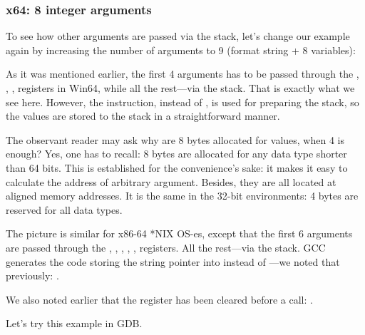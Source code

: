 \subsubsection{x64: 8 integer arguments}

\label{example_printf8_x64}
To see how other arguments are passed via the stack, let's change our example again 
by increasing the number of arguments to 9 (\printf format string + 8 \Tint variables):




As it was mentioned earlier, the first 4 arguments has to be passed through the \RCX, \RDX, ,  registers in Win64, while all the rest---via the stack.
That is exactly what we see here.
However, the \MOV instruction, instead of \PUSH, is used for preparing the stack, so the values are stored to the stack in a straightforward manner.



The observant reader may ask why are 8 bytes allocated for \Tint values, when 4 is enough?
Yes, one has to recall: 8 bytes are allocated for any data type shorter than 64 bits.
This is established for the convenience's sake: it makes it easy to calculate the address of arbitrary argument.
Besides, they are all located at aligned memory addresses.
It is the same in the 32-bit environments: 4 bytes are reserved for all data types.



The picture is similar for x86-64 *NIX OS-es, except that the first 6 arguments are passed through the \RDI, \RSI,
\RDX, \RCX, ,  registers.
All the rest---via the stack.
GCC generates the code storing the string pointer into \EDI instead of \RDI{}---we noted that previously: 
.

We also noted earlier that the \EAX register has been cleared before a \printf call: .




Let's try this example in \ac{GDB}.

